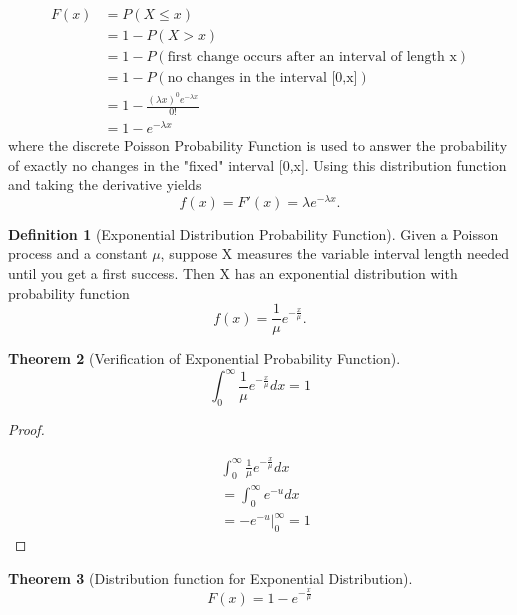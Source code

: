 \documentclass[10pt,]{book}
\theoremstyle{plain}
\newtheorem{theorem}{Theorem}[section]
\theoremstyle{definition}
\newtheorem{definition}[theorem]{Definition}
\theoremstyle{definition}
\theoremstyle{definition}
\numberwithin{equation}{section}
\newcommand{\gt}{ > }
\begin{document}
\begin{align*}
F(x)&  = P(X \le x)\\
 & = 1 - P(X \gt x)\\
 & = 1 - P(\text{first change occurs after an interval of length x})\\
 & = 1 - P(\text{no changes in the interval [0,x]})\\
 & = 1 - \frac{(\lambda x)^0 e^{-\lambda x}}{0!}\\
 & = 1 - e^{-\lambda x}
\end{align*}
where the discrete Poisson Probability Function is used to answer the probability of exactly no changes in the "fixed" interval [0,x]. Using this distribution function and taking the derivative yields
\begin{equation*}f(x) = F'(x) = \lambda e^{-\lambda x}.\end{equation*}
%
\begin{definition}[{Exponential Distribution Probability Function}]\label{definition-32}
Given a Poisson process and a constant \(\mu\), suppose X measures the variable interval length needed until you get a first success.  Then X has an exponential distribution with probability function
		\begin{equation*}f(x) = \frac{1}{\mu} e^{-\frac{x}{\mu}}.\end{equation*}
\end{definition}
\begin{theorem}[{Verification of Exponential Probability Function}]\label{theorem-49}
\begin{equation*}\int_0^{\infty} \frac{1}{\mu} e^{-\frac{x}{\mu}} dx = 1\end{equation*}\end{theorem}
\begin{proof}\hypertarget{proof-48}{}

		\begin{align*}
 & \int_0^{\infty} \frac{1}{\mu} e^{-\frac{x}{\mu}} dx\\
 & = \int_0^{\infty} e^{-u} dx\\
 & = -e^{-u} \big |_0^{\infty} = 1
\end{align*}
\end{proof}
\begin{theorem}[{Distribution function for Exponential Distribution}]\label{theorem-50}
\begin{equation*}F(x) = 1 - e^{-\frac{x}{\mu}}\end{equation*}\end{theorem}
\end{document}
